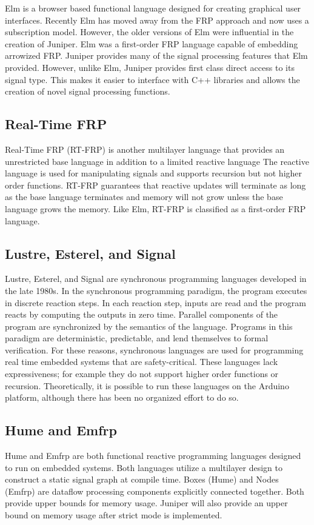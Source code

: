 \documentclass{sigplanconf}
\begin{document}
Elm \citep{elm} is a browser based functional language designed for creating graphical user interfaces. Recently Elm has moved away from the FRP approach and now uses a subscription model. However, the older versions of Elm were influential in the creation of Juniper. Elm was a first-order FRP language capable of embedding arrowized FRP. Juniper provides many of the signal processing features that Elm provided. However, unlike Elm, Juniper provides first class direct access to its signal type. This makes it easier to interface with C++ libraries and allows the creation of novel signal processing functions.

\subsection{Real-Time FRP}
Real-Time FRP (RT-FRP) \citep{rtfrp} is another multilayer language that provides an unrestricted base language in addition to a limited reactive language The reactive language is used for manipulating signals and supports recursion but not higher order functions. RT-FRP guarantees that reactive updates will terminate as long as the base language terminates and memory will not grow unless the base language grows the memory. Like Elm, RT-FRP is classified as a first-order FRP language.

\subsection{Lustre, Esterel, and Signal}
Lustre, Esterel, and Signal \citep{synchronous} are synchronous programming languages developed in the late 1980s. In the synchronous programming paradigm, the program executes in discrete reaction steps. In each reaction step, inputs are read and the program reacts by computing the outputs in zero time. Parallel components of the program are synchronized by the semantics of the language. Programs in this paradigm are deterministic, predictable, and lend themselves to formal verification. For these reasons, synchronous languages are used for programming real time embedded systems that are safety-critical. These languages lack expressiveness; for example they do not support higher order functions or recursion. Theoretically, it is possible to run these languages on the Arduino platform, although there has been no organized effort to do so. 

\subsection{Hume and Emfrp}
Hume \citep{hume} and Emfrp \citep{emfrp} are both functional reactive programming languages designed to run on embedded systems. Both languages utilize a multilayer design to construct a static signal graph at compile time. Boxes (Hume) and Nodes (Emfrp) are dataflow processing components explicitly connected together. Both provide upper bounds for memory usage. Juniper will also provide an upper bound on memory usage after strict mode is implemented.
\end{document}
